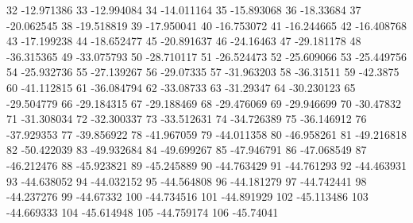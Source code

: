 32                      -12.971386
33                      -12.994084
34                      -14.011164
35                      -15.893068
36                       -18.33684
37                      -20.062545
38                      -19.518819
39                      -17.950041
40                      -16.753072
41                      -16.244665
42                      -16.408768
43                      -17.199238
44                      -18.652477
45                      -20.891637
46                       -24.16463
47                      -29.181178
48                      -36.315365
49                      -33.075793
50                      -28.710117
51                      -26.524473
52                      -25.609066
53                      -25.449756
54                      -25.932736
55                      -27.139267
56                       -29.07335
57                      -31.963203
58                       -36.31511
59                        -42.3875
60                      -41.112815
61                      -36.084794
62                       -33.08733
63                       -31.29347
64                      -30.230123
65                      -29.504779
66                      -29.184315
67                      -29.188469
68                      -29.476069
69                      -29.946699
70                       -30.47832
71                      -31.308034
72                      -32.300337
73                      -33.512631
74                      -34.726389
75                      -36.146912
76                      -37.929353
77                      -39.856922
78                      -41.967059
79                      -44.011358
80                      -46.958261
81                      -49.216818
82                      -50.422039
83                      -49.932684
84                      -49.699267
85                      -47.946791
86                      -47.068549
87                      -46.212476
88                      -45.923821
89                      -45.245889
90                      -44.763429
91                      -44.761293
92                      -44.463931
93                      -44.638052
94                      -44.032152
95                      -44.564808
96                      -44.181279
97                      -44.742441
98                      -44.237276
99                       -44.67332
100                      -44.734516
101                      -44.891929
102                      -45.113486
103                      -44.669333
104                      -45.614948
105                      -44.759174
106                       -45.74041
